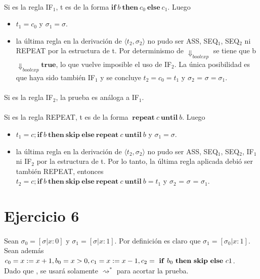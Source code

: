 \documentclass{article}
\begin{document}
\paragraph{}
Si es la regla IF$_1$, t es de la forma $ \mathbf{if\ } b \mathbf{\ then\ } c_0	 \mathbf{\ else\ } c_1$. Luego
\begin{itemize}
\item
$t_1 = c_0$ y $\sigma_1 = \sigma$.
\item
la \'ultima regla en la derivaci\'on de $\langle t_2, \sigma_2 \rangle$ no pudo ser ASS, SEQ$_1$, SEQ$_2$ ni REPEAT por la estructura de t. Por determinismo de $\Downarrow_{boolexp}$ se tiene que b $\Downarrow_{boolexp} \mathbf{true}$, lo que vuelve imposible el uso de IF$_2$. La \'unica posibilidad es que haya sido tambi\'en IF$_1$ y se concluye $ t_2 = c_0 = t_1$ y $ \sigma_2$ = $ \sigma = \sigma_1 $. 
\end{itemize}

\paragraph{}
Si es la regla IF$_2$, la prueba es an\'aloga a IF$_1$. 

\paragraph{}
Si es la regla REPEAT, t es de la forma $\mathbf{\ repeat\ } c \mathbf{\ until\ } b$. Luego
\begin{itemize}
\item
$ t_1 = c;\mathbf{if\ } b \mathbf{\ then\ skip\ else\ repeat\  } c \mathbf{\ until\ } b $  y $ \sigma_1 = \sigma$.
\item
la \'ultima regla en la derivaci\'on de $\langle t_2, \sigma_2 \rangle$ no pudo ser ASS, SEQ$_1$, SEQ$_2$, IF$_1$ ni IF$_2$ por la estructura de t. Por lo tanto, la \'ultima regla aplicada debi\'o ser tambi\'en REPEAT, entonces\\$t_2 = c;\mathbf{if\ } b \mathbf{\ then\ skip\ else\ repeat\ } c \mathbf{\ until\ } b = t_1$ y $\sigma_2$ = $\sigma$ = $\sigma_1$.
\end{itemize}


\vspace{5mm}


\section{Ejercicio 6}
\paragraph{}
Sean $\sigma_{0} = [\sigma | x:0]$ y $\sigma_{1} = [\sigma | x:1]$. Por definici\'on es claro que $\sigma_{1} = [\sigma_{0} | x:1]$. Sean adem\'as $c_{0} = x:= x+1, b_{0} = x > 0 , c_{1} = x:= x-1, \\c_{2} = \mathbf{\ if\ } b_{0} \mathbf{\ then\ skip\ else\ } c1$.\\Dado que , se usar\'a solamente $\rightsquigarrow^{*}$ para acortar la prueba.\\
\end{document}
